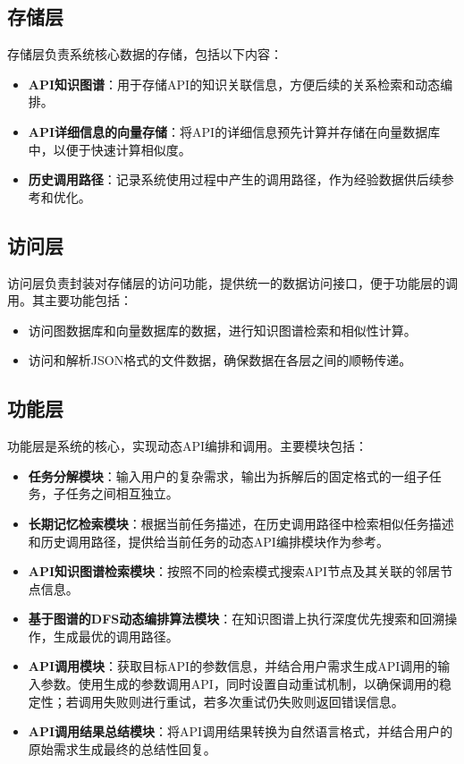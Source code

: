 \subsection{存储层}

存储层负责系统核心数据的存储，包括以下内容：
\begin{itemize}
    \item \textbf{API知识图谱}：用于存储API的知识关联信息，方便后续的关系检索和动态编排。
    \item \textbf{API详细信息的向量存储}：将API的详细信息预先计算并存储在向量数据库中，以便于快速计算相似度。
    \item \textbf{历史调用路径}：记录系统使用过程中产生的调用路径，作为经验数据供后续参考和优化。
\end{itemize}

\subsection{访问层}

访问层负责封装对存储层的访问功能，提供统一的数据访问接口，便于功能层的调用。其主要功能包括：
\begin{itemize}
    \item 访问图数据库和向量数据库的数据，进行知识图谱检索和相似性计算。
    \item 访问和解析JSON格式的文件数据，确保数据在各层之间的顺畅传递。
\end{itemize}

\subsection{功能层}

功能层是系统的核心，实现动态API编排和调用。主要模块包括：

\begin{itemize}
  \item \textbf{任务分解模块}：输入用户的复杂需求，输出为拆解后的固定格式的一组子任务，子任务之间相互独立。
  \item \textbf{长期记忆检索模块}：根据当前任务描述，在历史调用路径中检索相似任务描述和历史调用路径，提供给当前任务的动态API编排模块作为参考。
  \item \textbf{API知识图谱检索模块}：按照不同的检索模式搜索API节点及其关联的邻居节点信息。
  \item \textbf{基于图谱的DFS动态编排算法模块}：在知识图谱上执行深度优先搜索和回溯操作，生成最优的调用路径。
  \item \textbf{API调用模块}：获取目标API的参数信息，并结合用户需求生成API调用的输入参数。使用生成的参数调用API，同时设置自动重试机制，以确保调用的稳定性；若调用失败则进行重试，若多次重试仍失败则返回错误信息。
  \item \textbf{API调用结果总结模块}：将API调用结果转换为自然语言格式，并结合用户的原始需求生成最终的总结性回复。
\end{itemize}

